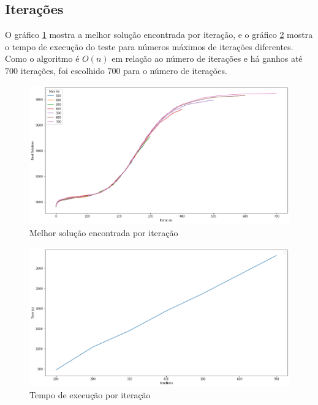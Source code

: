 \documentclass[10pt,twocolumn,letterpaper]{article}
\begin{document}
\subsection{Iterações}

O gráfico \ref{fig:itsbest} mostra a melhor solução encontrada por iteração, e o gráfico \ref{fig:ittime} mostra o tempo de execução do teste para números máximos de iterações diferentes. Como o algoritmo é $O(n)$ em relação ao número de iterações e há ganhos até $700$ iterações, foi escolhido $700$ para o número de iterações.

\begin{figure}[H]
   \begin{center}
      \includegraphics[width=\linewidth]{its}
   \end{center}
   \caption{Melhor solução encontrada por iteração}
   \label{fig:itsbest}
\end{figure}

\begin{figure}[H]
   \begin{center}
      \includegraphics[width=\linewidth]{ittime}
   \end{center}
   \caption{Tempo de execução por iteração}
   \label{fig:ittime}
\end{figure}
\end{document}
